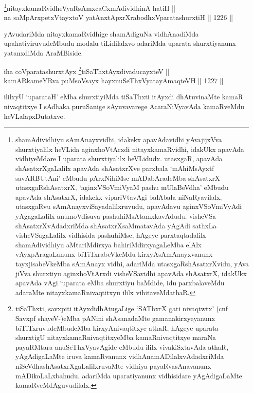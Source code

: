 \begin{shl}
\footnote{shamAdividhiyu sAmAnayxvidhi, idakekx apavAdavidhi yAvajijxVva shurxtiyalilx heVLida aginxhoVtArxdi nitayxkamaRvidhi, idakUkx apavAda vidhiyeMdare I uparata shurxtiyalilx heVLidudx. utasxgaR, apavAda shAsatxrXgaLalilx apavAda shAsatxrXve parxbala `mAhiMsAyxtf savARBUtAni' eMbudu pArxNihiMse mADabAradeMba shAsatxrX utasxgaRshAsatxrX, `aginxVSoVmiVyaM pashu mUlaBeVdha' eMbudu apavAda shAsatxrX, idakekx vipariVtavAgi balAbala niNaRyavilalx, utasxgaRvu sAmAnayxviSayadalilxruvudu, apavAdavu aginxVSoVmiVyAdi yAgagaLalilx anumoVdisuva pashuhiMsAtamxkavAdudu. visheVSa shAsatxrXvAdadxriMda shAsatxrXsaMmatavAda yAgAdi sathxLa visheVSagaLalilx vidhisida pashuhiMse, hAgeye parxtaqtadalilx shamAdividhiyu aMtariMdirxya bahiriMdirxyagaLeMba elAlx vAyxpAragaLanunx biTiTxrabeVkeMdu kirxyAsAmAnayxvanunx tayxjisabeVkeMba sAmAnayx vidhi, adariMda utasxgaRshAsatxrXvidu, yAva jiVva shurxtiyu aginxhoVtArxdi visheVSavidhi apavAda shAsatxrX, idakUkx apavAda vAgi `uparata eMba shurxtiyu baMdide, idu parxbalaveMdu adaraMte nitayxkamaRnivaqtitxyu  ililx vihitaveMdathaR.}nitayxkamaRvidheVyaRsAmxcaCxmAdividhinA hatiH || \\
na saMpArxpetxVtayxtoV yatAnxtApxrXrabodhxVparatashurxtiH \hfill || 1226 ||  
\end{shl}

\begin{artha}
yAvudariMda nitayxkamaRvidhige shamAdiguNa vidhAnadiMda upahatiyiruvudeMbudu modalu tiLidilalxvo adariMda uparata shurxtiyanunx yatanxdiMda AraMBiside.
\end{artha}


\begin{shl}
iha coVparatashurxtAyx \footnote{tiSaThxti, savxpiti itAyxdidhAtugaLige `SAThxrX gati nivaqtwtx' (cnf Savxpf shayeV-)eMba pANini shAsanadaMte gamanakirxyeyanunx biTiTxruvudeMbudeMba kirxyAnivaqtitxye athaR, hAgeye uparata shurxtigU nitayxkamaRnivaqtitxyeMba kamaRnivaqtitxye maraNa payaRMtara anuSeThxVyavAgide eMbudu ililx vivakiSxtavAda athaR, yAgAdigaLaMte iruva kamaRvanunx vidhAnamADilalxvAdadxriMda niSeVdhashAsatxrXgaLalilxruvaMte vidhiya payaRvasAnavanunx mADikoLaLxbahudu. adariMda uparatiyanunx vidhisidare yAgAdigaLaMte kamaRveMdAguvudilalx.}tiSaThxtAyxdivaducayxteV || \\
kamARkameYRva puMsoV\s sayx hayxnuSeThxVyatayA\s \s maqteVH \hfill || 1227 ||  
\end{shl}

\begin{artha}
ililxyU `uparataH' eMba shurxtiyiMda tiSaThxti itAyxdi dhAtuvinaMte kamaR nivaqtitxye I sAdhaka puruSanige sAyuvavarege AcaraNiVyavAda kamaRveMdu heVLalapxDutatxve.
\end{artha}

